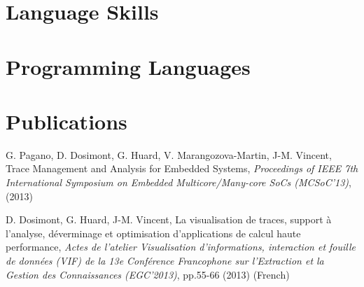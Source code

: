 \documentclass[11pt,a4paper]{moderncv}
\begin{document}

\section{Language Skills}

\section{Programming Languages}

\section{Publications}

\cvline{[1]}%
{\small G. Pagano, D. Dosimont, G. Huard, V. Marangozova-Martin, J-M. Vincent, Trace Management and Analysis for Embedded Systems, \emph{Proceedings of IEEE 7th International Symposium on Embedded Multicore/Many-core SoCs (MCSoC'13)},
  (2013)}	

\cvline{[2]}%
{\small D. Dosimont, G. Huard, J-M. Vincent,
   La visualisation de traces, support à l'analyse, déverminage et optimisation d'applications de calcul haute performance, \emph{Actes de l'atelier Visualisation d'informations, interaction et fouille de données (VIF) de la 13e Conférence Francophone sur l'Extraction et la Gestion des Connaissances (EGC'2013)}, pp.55-66 (2013) (French)}
\end{document}
